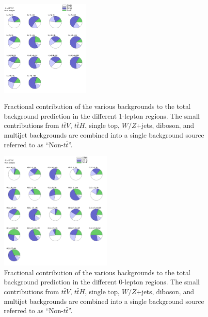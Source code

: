 \begin{figure}[p]
\centering
\includegraphics[width=0.4\textwidth]{figures/VLQ/PieChart_1L.png}
\captionsetup{width=0.85\textwidth} \caption{\small Fractional contribution of the various backgrounds to the total background prediction in the different 1-lepton regions. The small contributions from $t\bar{t} V$, $t\bar{t} H$, single top, $W/Z$+jets, diboson, and multijet backgrounds are combined into a single background source referred to as ``Non-$t\bar{t}$''.}
\label{sec:vlq:fig:Pie1l}
\includegraphics[width=0.5\textwidth]{figures/VLQ/PieChart_0L.png}
\captionsetup{width=0.85\textwidth}  \caption{\small Fractional contribution of the various backgrounds to the total background prediction in the different 0-lepton regions. The small contributions from $t\bar{t} V$, $t\bar{t} H$, single top, $W/Z$+jets, diboson, and multijet backgrounds are combined into a single background source referred to as ``Non-$t\bar{t}$''.}
\label{sec:vlq:fig:Pie0l}
\end{figure}

